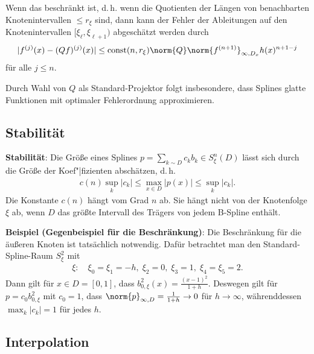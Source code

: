 Wenn das  beschränkt ist, d.\,h. wenn die Quotienten der Längen
von benachbarten Knotenintervallen $\le r_\xi$ sind, dann kann der Fehler der Ableitungen auf den
Knotenintervallen $[\xi_\ell, \xi_{\ell+1})$ abgeschätzt werden durch
\begin{align*}
    |f^{(j)}(x) - (Qf)^{(j)}(x)| \le \text{const}(n, r_\xi) \norm{Q}
    \norm{f^{(n+1)}}_{\infty,D_x} h(x)^{n+1-j}
\end{align*}
für alle $j \le n$.

Durch Wahl von $Q$ als Standard-Projektor folgt insbesondere, dass Splines glatte Funktionen mit
optimaler Fehlerordnung approximieren.

\subsection{%
    Stabilität%
}

\textbf{Stabilität}:
Die Größe eines Splines $p = \sum_{k \sim D} c_k b_k \in S_\xi^n(D)$
lässt sich durch die Größe der Koef"|fizienten abschätzen, d.\,h.
\begin{align*}
    c(n) \sup_k |c_k| \le \max_{x \in D} |p(x)| \le \sup_k |c_k|.
\end{align*}
Die Konstante $c(n)$ hängt vom Grad $n$ ab.
Sie hängt nicht von der Knotenfolge $\xi$ ab, wenn $D$ das größte Intervall des Trägers von jedem
B-Spline enthält.

\linie

\textbf{Beispiel (Gegenbeispiel für die Beschränkung)}:
Die Beschränkung für die äußeren Knoten ist tatsächlich notwendig.
Dafür betrachtet man den Standard-Spline-Raum $S_\xi^2$ mit
\begin{align*}
    \xi\colon\quad
    \xi_0 = \xi_1 = -h,\;
    \xi_2 = 0,\;
    \xi_3 = 1,\;
    \xi_4 = \xi_5 = 2.
\end{align*}
Dann gilt für $x \in D = [0, 1]$, dass $b_{0,\xi}^2(x) = \frac{(x - 1)^2}{1 + h}$.
Deswegen gilt für $p = c_0 b_{0,\xi}^2$ mit $c_0 = 1$, dass
$\norm{p}_{\infty,D} = \frac{1}{1 + h} \to 0$ für $h \to \infty$,
währenddessen $\max_k |c_k| = 1$ für jedes $h$.

\pagebreak

\subsection{%
    Interpolation%
}

